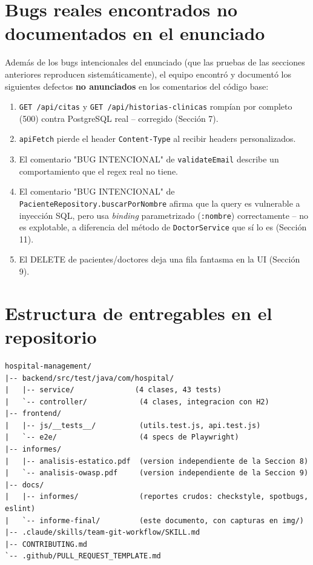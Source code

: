 \documentclass[11pt,a4paper]{article}
\begin{document}
\section{Bugs reales encontrados no documentados en el enunciado}

Adem\'as de los bugs intencionales del enunciado (que las pruebas de las
secciones anteriores reproducen sistem\'aticamente), el equipo encontr\'o y
document\'o los siguientes defectos \textbf{no anunciados} en los
comentarios del c\'odigo base:

\begin{enumerate}[nosep]
  \item \texttt{GET /api/citas} y \texttt{GET /api/historias-clinicas}
    romp\'ian por completo (500) contra PostgreSQL real -- corregido
    (Secci\'on 7).
  \item \texttt{apiFetch} pierde el header \texttt{Content-Type} al recibir
    headers personalizados.
  \item El comentario "BUG INTENCIONAL" de \texttt{validateEmail} describe
    un comportamiento que el regex real no tiene.
  \item El comentario "BUG INTENCIONAL" de
    \texttt{PacienteRepository.buscarPorNombre} afirma que la query es
    vulnerable a inyecci\'on SQL, pero usa \emph{binding} parametrizado
    (\texttt{:nombre}) correctamente -- no es explotable, a diferencia del
    m\'etodo de \texttt{DoctorService} que s\'i lo es (Secci\'on 11).
  \item El DELETE de pacientes/doctores deja una fila fantasma en la UI
    (Secci\'on 9).
\end{enumerate}

\section{Estructura de entregables en el repositorio}

\begin{lstlisting}
hospital-management/
|-- backend/src/test/java/com/hospital/
|   |-- service/              (4 clases, 43 tests)
|   `-- controller/            (4 clases, integracion con H2)
|-- frontend/
|   |-- js/__tests__/          (utils.test.js, api.test.js)
|   `-- e2e/                   (4 specs de Playwright)
|-- informes/
|   |-- analisis-estatico.pdf  (version independiente de la Seccion 8)
|   `-- analisis-owasp.pdf     (version independiente de la Seccion 9)
|-- docs/
|   |-- informes/              (reportes crudos: checkstyle, spotbugs, eslint)
|   `-- informe-final/         (este documento, con capturas en img/)
|-- .claude/skills/team-git-workflow/SKILL.md
|-- CONTRIBUTING.md
`-- .github/PULL_REQUEST_TEMPLATE.md
\end{lstlisting}
\end{document}
